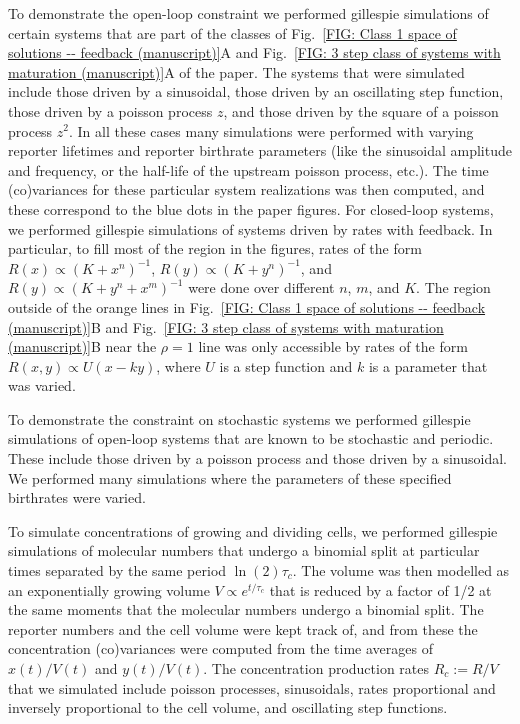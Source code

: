 \documentclass[%
 reprint,
superscriptaddress,
%
%
%
%
%
%
%
%
%
 amsmath,amssymb,
 aps,
%
%
%
%
%
%
onecolumn]{revtex4-2}
\begin{document}
To demonstrate the open-loop constraint we performed gillespie simulations of certain systems that are part of the classes of Fig.~\ref{FIG: Class 1 space of solutions -- feedback (manuscript)}A and Fig.~\ref{FIG: 3 step class of systems with maturation (manuscript)}A of the paper. The systems that were simulated include those driven by a sinusoidal, those driven by an oscillating step function, those driven by a poisson process $z$, and those driven by the square of a poisson process $z^2$. In all these cases many simulations were performed with varying reporter lifetimes and reporter birthrate parameters (like the sinusoidal amplitude and frequency, or the half-life of the upstream poisson process, etc.). The time (co)variances for these particular system realizations was then computed, and these correspond to the blue dots in the paper figures. For closed-loop systems, we performed gillespie simulations of systems driven by rates with feedback. In particular, to fill most of the region in the figures, rates of the form $R(x) \propto (K + x^{n})^{-1}$, $R(y) \propto (K + y^{n})^{-1}$, and $R(y) \propto (K + y^{n} + x^{m})^{-1}$ were done over different $n$, $m$, and $K$. The region outside of the orange lines in Fig.~\ref{FIG: Class 1 space of solutions -- feedback (manuscript)}B and Fig.~\ref{FIG: 3 step class of systems with maturation (manuscript)}B near the $\rho = 1$ line was only accessible by rates of the form $R(x,y) \propto U(x - ky)$, where $U$ is a step function and $k$ is a parameter that was varied. 

To demonstrate the constraint on stochastic systems we performed gillespie simulations of open-loop systems that are known to be stochastic and periodic. These include those driven by a poisson process and those driven by a sinusoidal. We performed many simulations where the parameters of these specified birthrates were varied.

To simulate concentrations of growing and dividing cells, we performed gillespie simulations of molecular numbers that undergo a binomial split at particular times separated by the same period $\ln(2)\tau_{c}$. The volume was then modelled as an exponentially growing volume $V \propto e^{t/\tau_{c}}$ that is reduced by a factor of 1/2 at the same moments that the molecular numbers undergo a binomial split. The reporter numbers and the cell volume were kept track of, and from these the concentration (co)variances were computed from the time averages of $x(t)/V(t)$ and $y(t)/V(t)$. The concentration production rates $R_{c} := R/V$ that we simulated include poisson processes, sinusoidals, rates proportional and inversely proportional to the cell volume, and oscillating step functions.  
\end{document}
